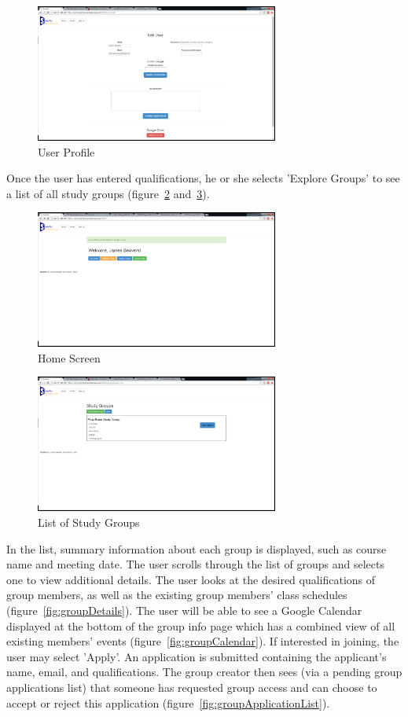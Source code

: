 \documentclass[conference]{IEEEtran}
\begin{document}
\begin{figure}[ht!]
\centering
\includegraphics[width=80mm]{figures/profile}
\caption{User Profile \label{fig:profile}}
\end{figure}

Once the user has entered qualifications, he or she selects 'Explore Groups' to see a list of all study groups (figure~\ref{fig:home} and~\ref{fig:groupList}). 

\begin{figure}[ht!]
\centering
\includegraphics[width=80mm]{figures/home}
\caption{Home Screen \label{fig:home}}
\end{figure}

\begin{figure}[ht!]
\centering
\includegraphics[width=80mm]{figures/groupList}
\caption{List of Study Groups \label{fig:groupList}}
\end{figure}

In the list, summary information about each group is displayed, such as course name and meeting date.  The user scrolls through the list of groups and selects one to view additional details.
The user looks at the desired qualifications of group members, as well as the existing group members' class schedules (figure~\ref{fig:groupDetails}).  The user will be able to see a Google Calendar displayed at the bottom of the group info page which has a combined view of all existing members' events (figure~\ref{fig:groupCalendar}).  If interested in joining, the user may select 'Apply'.  An application is submitted containing the applicant's name, email, and qualifications.
The group creator then sees (via a pending group applications list) that someone has requested group access and can choose to accept or reject this application (figure~\ref{fig:groupApplicationList}).
\end{document}
